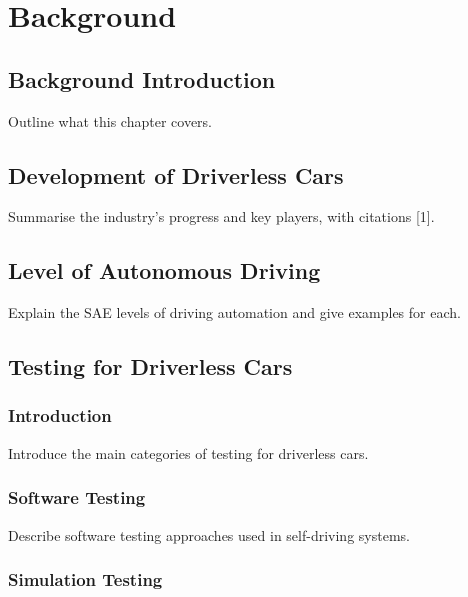 \documentclass[
  12pt,
  a4paper,
]{report}
\begin{document}
\chapter{Background}\label{background}

\section{Background Introduction}\label{background-introduction}

Outline what this chapter covers.

\section{Development of Driverless
Cars}\label{development-of-driverless-cars}

Summarise the industry's progress and key players, with citations
{[}1{]}.

\section{Level of Autonomous Driving}\label{level-of-autonomous-driving}

Explain the SAE levels of driving automation and give examples for each.

\section{Testing for Driverless Cars}\label{testing-for-driverless-cars}

\subsection{Introduction}\label{introduction-1}

Introduce the main categories of testing for driverless cars.

\subsection{Software Testing}\label{software-testing}

Describe software testing approaches used in self-driving systems.

\subsection{Simulation Testing}\label{simulation-testing}
\end{document}

